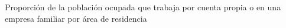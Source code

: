 Proporción de la población ocupada que trabaja por cuenta propia o en una empresa familiar por área de residencia
